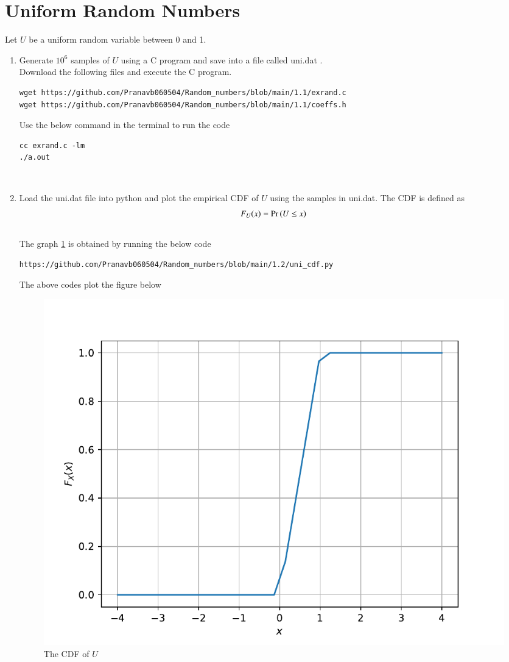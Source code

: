 \documentclass[journal,12pt,twocolumn]{IEEEtran}
\renewcommand\thesection{\arabic{section}}
\begin{document}
\section{Uniform Random Numbers}
Let $U$ be a uniform random variable between 0 and 1.
\begin{enumerate}[label=\thesection.\arabic*
,ref=\thesection.\theenumi]
\item Generate $10^6$ samples of $U$ using a C program and save into a file called uni.dat .
\\
\solution Download the following files and execute the  C program.
\begin{lstlisting}
wget https://github.com/Pranavb060504/Random_numbers/blob/main/1.1/exrand.c
wget https://github.com/Pranavb060504/Random_numbers/blob/main/1.1/coeffs.h
\end{lstlisting}
Use the below command in the terminal to run the code
\begin{lstlisting}
cc exrand.c -lm
./a.out
\end{lstlisting}
\\
%
\item
Load the uni.dat file into python and plot the empirical CDF of $U$ using the samples in uni.dat. The CDF is defined as
\begin{align}
F_{U}(x) = \Pr\left(U \le x\right)
\end{align}
\\
\solution 
The graph \ref{fig:uni_cdf} is obtained by running the below code
\begin{lstlisting}
https://github.com/Pranavb060504/Random_numbers/blob/main/1.2/uni_cdf.py
\end{lstlisting}
The above codes plot the figure below
\begin{figure}[h]
\centering
\includegraphics[width=\columnwidth]{./uni_cdf}
\caption{The CDF of $U$}
\label{fig:uni_cdf}
\end{figure}


\end{enumerate}
\end{document}
